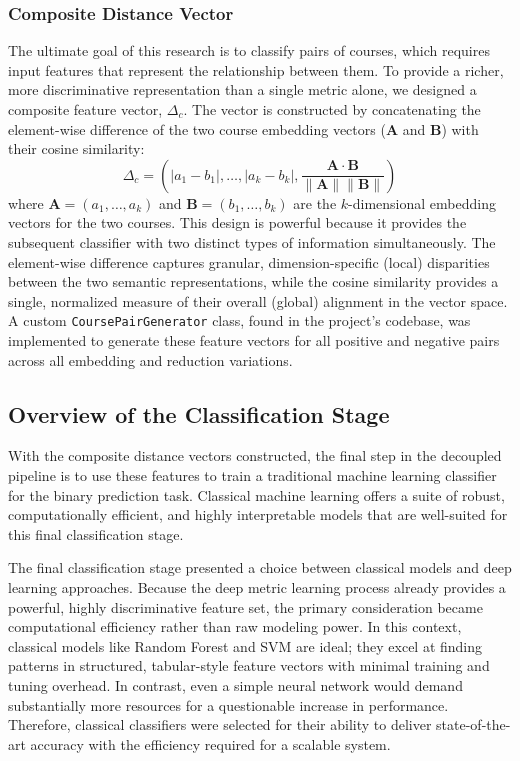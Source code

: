 \subsubsection{Composite Distance Vector}\label{ch:3.2.3.2}
The ultimate goal of this research is to classify pairs of courses, which requires input features that represent the relationship between them. To provide a richer, more discriminative representation than a single metric alone, we designed a composite feature vector, \(\Delta_c\). The vector is constructed by concatenating the element-wise difference of the two course embedding vectors (\(\mathbf{A}\) and \(\mathbf{B}\)) with their cosine similarity:
\[ \Delta_c = \left( \lvert a_1 - b_1\rvert, \dots, \lvert a_k - b_k\rvert, \frac{\mathbf{A}\cdot\mathbf{B}}{\parallel \mathbf{A} \parallel \parallel \mathbf{B} \parallel } \right) \]
where \(\mathbf{A} = (a_1, \dots, a_k) \) and \(\mathbf{B} = (b_1, \dots, b_k) \) are the \(k\)-dimensional embedding vectors for the two courses. This design is powerful because it provides the subsequent classifier with two distinct types of information simultaneously. The element-wise difference captures granular, dimension-specific (local) disparities between the two semantic representations, while the cosine similarity provides a single, normalized measure of their overall (global) alignment in the vector space. A custom \verb|CoursePairGenerator| class, found in the project's codebase, was implemented to generate these feature vectors for all positive and negative pairs across all embedding and reduction variations.

\subsection{Overview of the Classification Stage}\label{ch:3.2.4} 
With the composite distance vectors constructed, the final step in the decoupled pipeline is to use these features to train a traditional machine learning classifier for the binary prediction task.  Classical machine learning offers a suite of robust, computationally efficient, and highly interpretable models that are well-suited for this final classification stage.

The final classification stage presented a choice between classical models and deep learning approaches. Because the deep metric learning process already provides a powerful, highly discriminative feature set, the primary consideration became computational efficiency rather than raw modeling power. In this context, classical models like Random Forest and SVM are ideal; they excel at finding patterns in structured, tabular-style feature vectors with minimal training and tuning overhead. In contrast, even a simple neural network would demand substantially more resources for a questionable increase in performance. Therefore, classical classifiers were selected for their ability to deliver state-of-the-art accuracy with the efficiency required for a scalable system.


